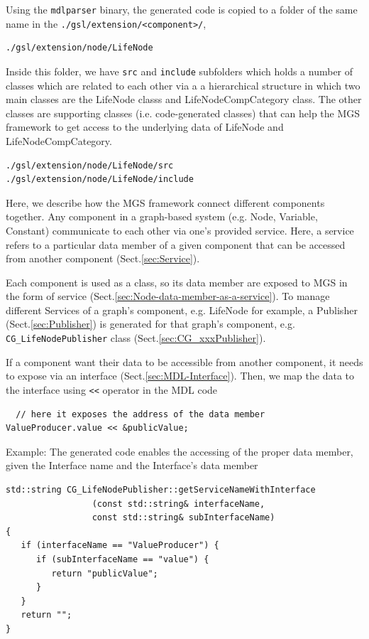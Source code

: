 Using the \verb!mdlparser! binary, the generated code is copied to a folder of
the same name in the \verb!./gsl/extension/<component>/!,
\begin{verbatim}
./gsl/extension/node/LifeNode
\end{verbatim}

Inside this folder, we have \verb!src! and \verb!include! subfolders which holds
a number of classes which are related to each other via a
a hierarchical structure in which two main classes are the LifeNode classs and
LifeNodeCompCategory class. The other classes are supporting classes (i.e.
code-generated classes) that can help the MGS framework to get access to the
underlying data of LifeNode and LifeNodeCompCategory.

\begin{verbatim}
./gsl/extension/node/LifeNode/src
./gsl/extension/node/LifeNode/include
\end{verbatim}

Here, we describe how the MGS framework connect different components together.
Any component in a graph-based system (e.g. Node, Variable, Constant)
communicate to each other via one's provided service. Here, a service refers to
a particular data member of a given component that can be accessed from another 
component (Sect.\ref{sec:Service}).

Each component is used as a class, so its data member are exposed to MGS in the
form of service (Sect.\ref{sec:Node-data-member-as-a-service}).
To manage different Services of a graph's component, e.g. LifeNode for example,
a Publisher (Sect.\ref{sec:Publisher}) is generated for that graph's component,
e.g.
\verb!CG_LifeNodePublisher! class (Sect.\ref{sec:CG_xxxPublisher}).

If a component want their data to be accessible from another component, it
needs to expose via an interface (Sect.\ref{sec:MDL-Interface}). Then, we map
the data to the interface using \verb!<<! operator in the MDL code
\begin{verbatim}
  // here it exposes the address of the data member
ValueProducer.value << &publicValue;
\end{verbatim}

Example: The generated code enables the accessing of the proper data member,
given the Interface name and the Interface's data member
{\tiny
\begin{verbatim}
std::string CG_LifeNodePublisher::getServiceNameWithInterface
                 (const std::string& interfaceName, 
                 const std::string& subInterfaceName) 
{
   if (interfaceName == "ValueProducer") {
      if (subInterfaceName == "value") {
         return "publicValue";
      }
   }
   return "";
}
\end{verbatim}
}

